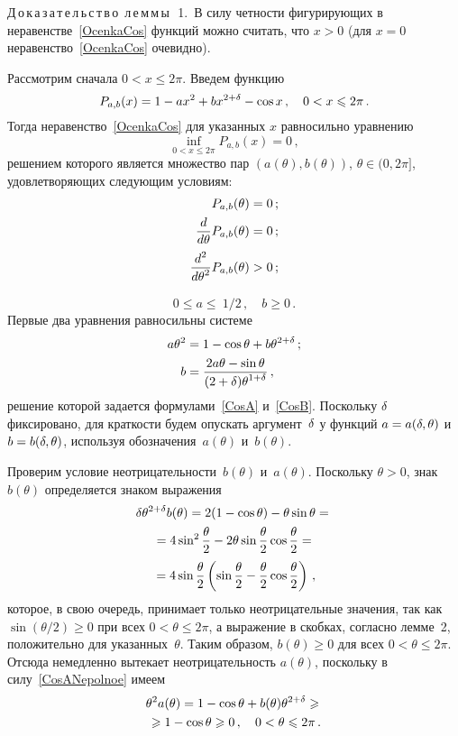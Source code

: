\begin{multicols}{2}
\medskip

\noindent
Д\,о\,к\,а\,з\,а\,т\,е\,л\,ь\,с\,т\,в\,о\ л\,е\,м\,м\,ы\,\ 1.\
В силу четности фигурирующих в неравенстве~\eqref{OcenkaCos} функций
можно считать, что $x>0$ (для $x=0$ неравенство~\eqref{OcenkaCos}
очевидно).

Рассмотрим сначала $0<x\le 2\pi.$ Введем функцию
$$
P_{a,b}(x)=1-ax^2+bx^{2+\delta}-\cos x\,,\quad 0<x\leqslant 2 \pi\,.
$$
Тогда неравенство~\eqref{OcenkaCos} для указанных $x$ равносильно уравнению
$$
\inf_{0< x\le2\pi} P_{a,b}(x)=0\,,
$$
решением которого является множество пар $(a(\theta),b(\theta))$,
${\theta\in(0,2\pi]}$, удовлетворяющих сле\-ду\-ющим условиям:
\begin{align*}
P_{a,b}(\theta)&=0\,;\\
\displaystyle\frac{\displaystyle d\mathstrut}{\displaystyle d\theta\mathstrut}P_{a,b}(\theta)&=0\,;\\
\displaystyle\frac{\displaystyle d^2\mathstrut}{\displaystyle d\theta^2\mathstrut}P_{a,b}(\theta)&>0\,;
\end{align*}
\vspace*{-6pt}

\noindent
$$
0 \le a \le\ 1/2\,,\quad b \ge0\,.
$$
Первые два уравнения равносильны системе
\begin{align}
a\theta^2&= 1-\cos\theta+b\theta^{2+\delta}\,;
\label{CosANepolnoe}\\
b&=\displaystyle\frac{\displaystyle 2a\theta-\sin\theta\mathstrut}{\displaystyle (2+\delta)\theta^{1+\delta}\mathstrut}\,,
\label{CosBNepolnoe}
\end{align}
решение которой задается формулами~\eqref{CosA} и~\eqref{CosB}.
Поскольку $\delta$ фиксировано, для краткости будем опускать аргумент~$\delta$
у функций $a=a(\delta,\theta)$ и $b=b(\delta,\theta)$, используя
обозначения~$a(\theta)$ и~$b(\theta)$.

Проверим условие неотрицательности~$b(\theta)$ и~$a(\theta)$.
Поскольку $\theta>0$, знак~$b(\theta)$ определяется знаком выражения
\begin{multline*}
\delta\theta^{2+\delta}b(\theta)=2(1-\cos \theta)-\theta\sin\theta={}\\
{}=
4\sin^2\displaystyle\frac{\displaystyle \theta\mathstrut}{\displaystyle 2\mathstrut}-2\theta\sin\displaystyle\frac{\displaystyle \theta\mathstrut}{\displaystyle 2\mathstrut}\cos\displaystyle\frac{\displaystyle \theta\mathstrut}{\displaystyle 2\mathstrut}={}\\
{}=
4\sin\displaystyle\frac{\displaystyle \theta\mathstrut}{\displaystyle 2\mathstrut}
\left(\sin\displaystyle\frac{\displaystyle \theta\mathstrut}{\displaystyle 2\mathstrut}-\displaystyle\frac{\displaystyle \theta\mathstrut}{\displaystyle 2\mathstrut}\cos\displaystyle\frac{\displaystyle \theta\mathstrut}{\displaystyle 2\mathstrut}\right)\,,
\end{multline*}
которое, в свою очередь, принимает только неотрицательные значения,
так как ${\sin(\theta/2)\ge0}$ при всех ${0<\theta\le2\pi}$, а
выражение в скобках, согласно лемме~2, положительно для
указанных~$\theta$. Таким образом, ${b(\theta)\ge0}$ для всех
${0<\theta\le2\pi}$. Отсюда немедленно вытекает неотрицательность
$a(\theta)$, поскольку в силу~\eqref{CosANepolnoe} имеем
\begin{multline*}
\theta^2 a(\theta)=
1-\cos\theta+b(\theta)\theta^{2+\delta}\geqslant{}\\
{}\geqslant 1-\cos\theta\geqslant0\,,\quad
0<\theta\leqslant2\pi\,.
\end{multline*}


\end{multicols}
